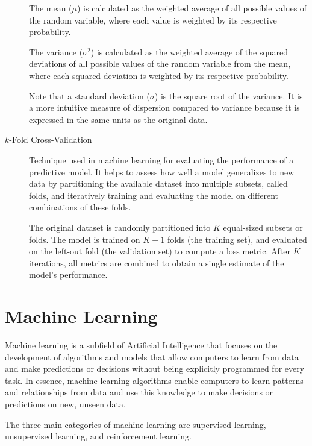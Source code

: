 \documentclass[a4paper]{article}
\begin{document}
\begin{description}
The mean ($\mu$) is calculated as the weighted average of all possible values of the random variable, where each value is weighted by its respective probability. 

The variance ($\sigma^2$) is calculated as the weighted average of the squared deviations of all possible values of the random variable from the mean, where each squared deviation is weighted by its respective probability. 

Note that a standard deviation ($\sigma$) is the square root of the variance. It is a more intuitive measure of dispersion compared to variance because it is expressed in the same units as the original data.

\item[$k$-Fold Cross-Validation]
Technique used in machine learning for evaluating the performance of a predictive model. It helps to assess how well a model generalizes to new data by partitioning the available dataset into multiple subsets, called folds, and iteratively training and evaluating the model on different combinations of these folds.

The original dataset is randomly partitioned into $K$ equal-sized subsets or folds. The model is trained on $K-1$ folds (the training set), and evaluated on the left-out fold (the validation set) to compute a loss metric. After $K$ iterations, all metrics are combined to obtain a single estimate of the model's performance.

\end{description}

\section*{Machine Learning}
Machine learning is a subfield of Artificial Intelligence that focuses on the development of algorithms and models that allow computers to learn from data and make predictions or decisions without being explicitly programmed for every task. In essence, machine learning algorithms enable computers to learn patterns and relationships from data and use this knowledge to make decisions or predictions on new, unseen data.

The three main categories of machine learning are supervised learning, unsupervised learning, and reinforcement learning.
\end{document}
